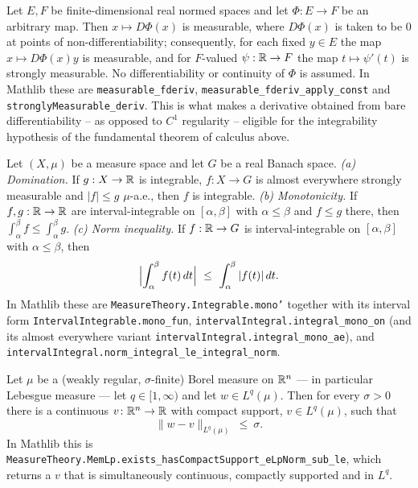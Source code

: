\begin{proposition}
Let $E,F$ be finite-dimensional real normed spaces and let $\Phi:E\to F$ be an
arbitrary map.  Then $x\mapsto D\Phi(x)$ is measurable, where $D\Phi(x)$ is
taken to be $0$ at points of non-differentiability; consequently, for each fixed
$y\in E$ the map $x\mapsto D\Phi(x)y$ is measurable, and for $F$-valued
$\psi:\mathbb{R}\to F$ the map $t\mapsto\psi'(t)$ is strongly measurable.  No
differentiability or continuity of $\Phi$ is assumed.  In Mathlib these are
\texttt{measurable\_fderiv}, \texttt{measurable\_fderiv\_apply\_const} and
\texttt{stronglyMeasurable\_deriv}.  This is what makes a derivative obtained
from bare differentiability -- as opposed to $C^1$ regularity -- eligible for
the integrability hypothesis of the fundamental theorem of calculus above.
\end{proposition}

\begin{proposition}
Let $(X,\mu)$ be a measure space and let $G$ be a real Banach space.
\emph{(a) Domination.}  If $g:X\to\mathbb{R}$ is integrable, $f:X\to G$ is almost
everywhere strongly measurable and $|f|\le g$ $\mu$-a.e., then $f$ is
integrable.  \emph{(b) Monotonicity.}  If $f,g:\mathbb{R}\to\mathbb{R}$ are
interval-integrable on $[\alpha,\beta]$ with $\alpha\le\beta$ and $f\le g$
there, then $\int_\alpha^\beta f\le\int_\alpha^\beta g$.  \emph{(c) Norm
inequality.}  If $f:\mathbb{R}\to G$ is interval-integrable on $[\alpha,\beta]$ with
$\alpha\le\beta$, then
\[
\Bigl|\int_\alpha^\beta f(t)\,dt\Bigr|\ \le\ \int_\alpha^\beta|f(t)|\,dt .
\]
In Mathlib these are \texttt{MeasureTheory.Integrable.mono'} together with its
interval form \texttt{IntervalIntegrable.mono\_fun},
\texttt{intervalIntegral.integral\_mono\_on} (and its almost everywhere variant
\texttt{intervalIntegral.integral\_mono\_ae}), and
\texttt{intervalIntegral.norm\_integral\_le\_integral\_norm}.
\end{proposition}

\begin{proposition}
Let $\mu$ be a (weakly regular, $\sigma$-finite) Borel measure on $\mathbb{R}^n$ --- in
particular Lebesgue measure --- let $q\in[1,\infty)$ and let $w\in L^{q}(\mu)$.
Then for every $\sigma>0$ there is a continuous $v\colon\mathbb{R}^n\to\mathbb{R}$ with compact
support, $v\in L^{q}(\mu)$, such that
\[
\|w-v\|_{L^{q}(\mu)}\ \le\ \sigma .
\]
In Mathlib this is
\texttt{MeasureTheory.MemLp.exists\_hasCompactSupport\_eLpNorm\_sub\_le}, which
returns a $v$ that is simultaneously continuous, compactly supported and in
$L^{q}$.
\end{proposition}

